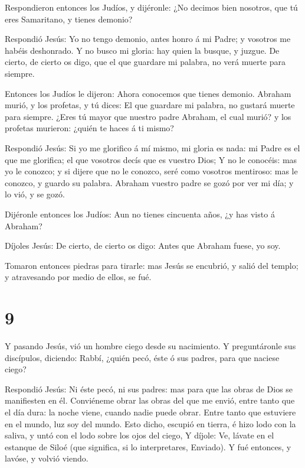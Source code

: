  Respondieron entonces los Judíos, y dijéronle: ¿No decimos
bien nosotros, que tú eres Samaritano, y tienes demonio?

 Respondió Jesús: Yo no tengo demonio, antes honro á mi
Padre; y vosotros me habéis deshonrado.  Y no busco mi
gloria: hay quien la busque, y juzgue.  De cierto, de
cierto os digo, que el que guardare mi palabra, no verá muerte para
siempre.

 Entonces los Judíos le dijeron: Ahora conocemos que tienes
demonio. Abraham murió, y los profetas, y tú dices: El que guardare mi
palabra, no gustará muerte para siempre.  ¿Eres tú mayor
que nuestro padre Abraham, el cual murió? y los profetas murieron:
¿quién te haces á ti mismo?

 Respondió Jesús: Si yo me glorifico á mí mismo, mi gloria
es nada: mi Padre es el que me glorifica; el que vosotros decís que es
vuestro Dios;  Y no le conocéis: mas yo le conozco; y si
dijere que no le conozco, seré como vosotros mentiroso: mas le conozco,
y guardo su palabra.  Abraham vuestro padre se gozó por ver
mi día; y lo vió, y se gozó.

 Dijéronle entonces los Judíos: Aun no tienes cincuenta
años, ¿y has visto á Abraham?

 Díjoles Jesús: De cierto, de cierto os digo: Antes que
Abraham fuese, yo soy.

 Tomaron entonces piedras para tirarle: mas Jesús se
encubrió, y salió del templo; y atravesando por medio de ellos, se fué.

\hypertarget{section-8}{%
\section{9}\label{section-8}}

 Y pasando Jesús, vió un hombre ciego desde su nacimiento.
 Y preguntáronle sus discípulos, diciendo: Rabbí, ¿quién
pecó, éste ó sus padres, para que naciese ciego?

 Respondió Jesús: Ni éste pecó, ni sus padres: mas para que
las obras de Dios se manifiesten en él.  Conviéneme obrar
las obras del que me envió, entre tanto que el día dura: la noche viene,
cuando nadie puede obrar.  Entre tanto que estuviere en el
mundo, luz soy del mundo.  Esto dicho, escupió en tierra, é
hizo lodo con la saliva, y untó con el lodo sobre los ojos del ciego,
 Y díjole: Ve, lávate en el estanque de Siloé (que
significa, si lo interpretares, Enviado). Y fué entonces, y lavóse, y
volvió viendo.

